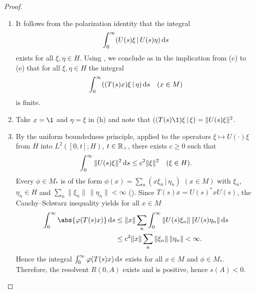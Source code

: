 \begin{proof}
\begin{enumerate}[wide, labelindent=.25em]
\item[(g) $\implies$ (h):] It follows from the polarization identity that the integral
\[
\int_{0}^{\infty}(U(s)\xi \,|\, U(s)\eta) \mathop{}\!\mathrm{d}{s}
\]
exists for all $\xi,\eta \in H$.
Using \textcite[Theorem III.4.2 and Theorem II.2.6]{takesaki:1979}, we conclude as in the implication from (c) to (e) that for all $\xi,\eta \in H$ the integral
\[
\int_{0}^{\infty}((T(s)x)\xi \,|\, \eta) \mathop{}\!\mathrm{d}{s} \quad (x \in M)
\]
is finite.

\item[(h) $\implies$ (g):] Take $x = \1$ and $\eta = \xi$ in (h) and note that $((T(s)\1)\xi \,|\, \xi) = \|U(s)\xi\|^2$.

\item[(g) $\implies$ (a):] By the uniform boundedness principle, applied to the operators $\xi \mapsto U(\cdot)\xi$ from $H$ into $L^{2}([0,t];H)$, $t \in \mathbb{R}_{+}$, there exists $c \geq 0$ such that
\[
\int_{0}^{\infty}\|U(s)\xi\|^{2} \ds \leq c^{2}\|\xi\|^{2} \quad (\xi \in H).
\]
Every $\phi \in M_{*}$ is of the form $\phi(x) = \sum_{n}(x\xi_{n} \,|\, \eta_{n})$ $(x \in M)$ with $\xi_{n}$, $\eta_{n} \in H$ and $\sum_{n}\|\xi_{n}\|\,\|\eta_{n}\| < \infty$ (\textcite[Theorem III.4.2 and Theorem II.2.6]{takesaki:1979}).
Since $T(s)x = U(s)^{*}xU(s)$, the Cauchy--Schwarz inequality yields for all $x \in M$
\begin{align*}
\int_{0}^{\infty} \abs{\phi(T(s)x)} \ds 
	&\leq \|x\| \sum_{n} \int_{0}^{\infty} \|U(s)\xi_{n}\|\,\|U(s)\eta_{n}\| \ds \\
	&\leq c^{2}\|x\| \sum_{n} \|\xi_{n}\|\,\|\eta_{n}\| < \infty .
\end{align*}
Hence the integral $\int_{0}^{\infty} \phi(T(s)x) \ds$ exists for all $x \in M$ and $\phi \in M_{*}$.
Therefore, the resolvent $R(0,A)$ exists and is positive, hence $s(A) < 0$.
\qedhere
\end{enumerate}
\end{proof}
